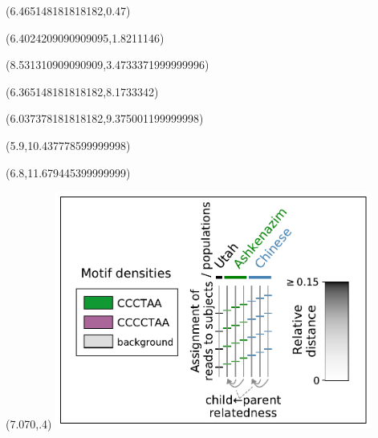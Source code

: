 \documentclass{article}
\begin{document}
\begin{textblock}{13}(6.465148181818182,0.47)\end{textblock}
\begin{textblock}{13}(6.4024209090909095,1.8211146)\end{textblock}
\begin{textblock}{13}(8.531310909090909,3.4733371999999996)\end{textblock}
\begin{textblock}{13}(6.365148181818182,8.1733342)\end{textblock}
\begin{textblock}{13}(6.037378181818182,9.375001199999998)\end{textblock}
\begin{textblock}{13}(5.9,10.437778599999998)\end{textblock}
\begin{textblock}{13}(6.8,11.679445399999999)\end{textblock}
\begin{textblock}{13}(7.070,.4)
\includegraphics[width=4.100in,keepaspectratio]{Figure_4/legend.pdf}
\end{textblock}
\end{document}
